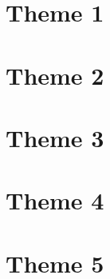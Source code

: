 \documentclass[
]{book}
\begin{document}
\hypertarget{theme-1}{%
\section{Theme 1}\label{theme-1}}

\hypertarget{theme-2}{%
\section{Theme 2}\label{theme-2}}

\hypertarget{theme-3}{%
\section{Theme 3}\label{theme-3}}

\hypertarget{theme-4}{%
\section{Theme 4}\label{theme-4}}

\hypertarget{theme-5}{%
\section{Theme 5}\label{theme-5}}

  
\end{document}
